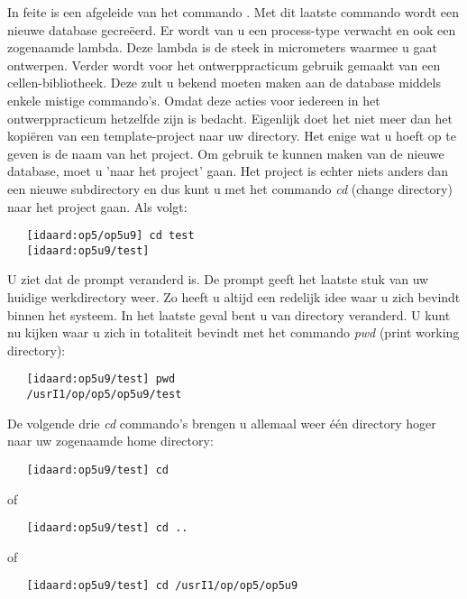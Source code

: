 In feite is  een afgeleide van het commando .
Met dit laatste commando wordt een nieuwe  database gecre\"eerd.
Er wordt van u een process-type verwacht en ook een zogenaamde lambda.
Deze lambda is de steek in micrometers waarmee u gaat ontwerpen.
Verder wordt voor het ontwerppracticum gebruik gemaakt van een cellen-bibliotheek.
Deze zult u bekend moeten maken aan de database middels enkele mistige
commando's.
Omdat deze acties voor iedereen in het ontwerppracticum hetzelfde zijn
is  bedacht.
Eigenlijk doet het niet meer dan het kopi\"eren van
een template-project naar uw directory.
Het enige wat u hoeft op te
geven is de naam van het project.
Om gebruik te kunnen maken van de nieuwe database,
moet u 'naar het project' gaan.
Het project is echter niets anders dan een nieuwe subdirectory
en dus kunt
u met het commando {\em cd} (change directory) naar het project gaan.
Als volgt:
\begin{verbatim}
   [idaard:op5/op5u9] cd test
   [idaard:op5u9/test]
\end{verbatim}

U ziet dat de prompt veranderd is.
De prompt geeft het laatste stuk van uw huidige werkdirectory weer.
Zo heeft u altijd een redelijk idee waar u zich
bevindt binnen het systeem.
In het laatste geval bent u van directory veranderd.
U kunt nu kijken waar u zich in totaliteit bevindt
met het commando {\em pwd} (print working directory):
\begin{verbatim}
   [idaard:op5u9/test] pwd
   /usrI1/op/op5/op5u9/test
\end{verbatim}

De volgende drie {\em cd} commando's brengen u allemaal weer \'e\'en directory hoger
naar uw zogenaamde home directory:
\begin{verbatim}
   [idaard:op5u9/test] cd
\end{verbatim}

of

\begin{verbatim}
   [idaard:op5u9/test] cd ..
\end{verbatim}

of

\begin{verbatim}
   [idaard:op5u9/test] cd /usrI1/op/op5/op5u9
\end{verbatim}

